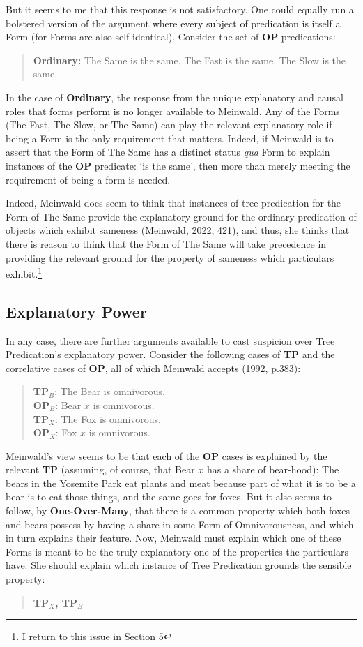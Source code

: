 But it seems to me that this response is not satisfactory. One could equally run a bolstered version of the argument where every subject of predication is itself a Form (for Forms are also self-identical). Consider the set of \textbf{OP} predications: 
\begin{quote}
\textbf{Ordinary:} The Same is the same, The Fast is the same, The Slow is the same.
\end{quote}

\noindent In the case of \textbf{Ordinary}, the response from the unique explanatory and causal roles that forms perform is no longer available to Meinwald. Any of the Forms (The Fast, The Slow, or The Same) can play the relevant explanatory role if being a Form is the only requirement that matters. Indeed, if Meinwald is to assert that the Form of The Same has a distinct status \textit{qua} Form to explain instances of the \textbf{OP} predicate: `is the same', then more than merely meeting the requirement of being a form is needed. 

Indeed, Meinwald does seem to think that instances of tree-predication for the Form of The Same provide the explanatory ground for the ordinary predication of objects which exhibit sameness (Meinwald, 2022, 421), and thus, she thinks that there is reason to think that the Form of The Same will take precedence in providing the relevant ground for the property of sameness which particulars exhibit.\footnote{I return to this issue in Section 5}

\subsection{Explanatory Power}

In any case, there are further arguments available to cast suspicion over Tree Predication's explanatory power. Consider the following cases of \textbf{TP} and the correlative cases of \textbf{OP}, all of which Meinwald accepts (1992, p.383):
\begin{quote}
\textbf{TP$_B$}: The Bear is omnivorous.\\
\textbf{OP$_B$}:  Bear $x$ is omnivorous.\\
\textbf{TP$_X$}: The Fox is omnivorous.\\
\textbf{OP$_X$}: Fox $x$ is omnivorous.
\end{quote}

\noindent Meinwald's view seems to be that each of the \textbf{OP} cases is explained by the relevant \textbf{TP} (assuming, of course, that Bear $x$ has a share of bear-hood): The bears in the Yosemite Park eat plants and meat because part of what it is to be a bear is to eat those things, and the same goes for foxes. But it also seems to follow, by \textbf{One-Over-Many}, that there is a common property which both foxes and bears possess by having a share in some Form of Omnivorousness, and which in turn explains their feature. Now, Meinwald must explain which one of these Forms is meant to be the truly explanatory one of the properties the particulars have. She should explain which instance of Tree Predication grounds the sensible property: 
\begin{quote}
    \textbf{TP$_X$, TP$_B$}
\end{quote}

